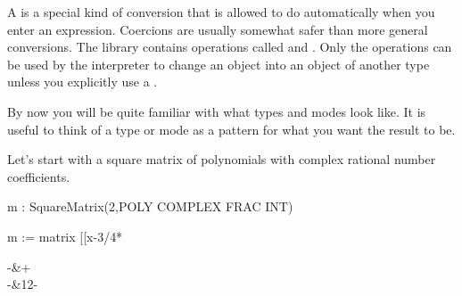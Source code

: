 A  is a special kind of conversion that \Language{} is
allowed to do automatically when you enter an expression.
Coercions are usually somewhat safer than more general conversions.
The \Language{} library contains operations called
 and .
Only the  operations can be used by the
interpreter to change an object into an object of another type unless
you explicitly use a \spadSyntax{::}.

By now you will be quite familiar with what types and modes look like.
It is useful to think of a type or mode as a pattern
for what you want the result to be.
\begin{xtc}
\begin{xtccomment}
Let's start with a square matrix of polynomials with complex rational number
coefficients.
\end{xtccomment}
\begin{spadsrc}
m : SquareMatrix(2,POLY COMPLEX FRAC INT) 
\end{spadsrc}
\end{xtc}
\begin{xtc}
\begin{xtccomment}
\end{xtccomment}
\begin{spadsrc}
m := matrix [[x-3/4*%
\end{spadsrc}
\begin{TeXOutput}
\begin{fricasmath}{4}
\begin{MATRIX}{2}-{\TIMES \ImaginaryI }&\TIMES {}+\\\TIMES \ImaginaryI \TIMES %
-{}&12-{\TIMES \ImaginaryI }%
\end{MATRIX}%
\end{fricasmath}
\end{TeXOutput}
\end{xtc}
